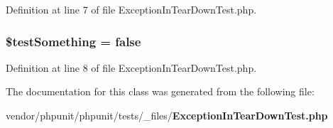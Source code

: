 Definition at line 7 of file Exception\+In\+Tear\+Down\+Test.\+php.

\subsubsection[{\$test\+Something}]{\setlength{\rightskip}{0pt plus 5cm}\${\bf test\+Something} = false}\label{class_exception_in_tear_down_test_a25acbdb5bf8dc30b31f537d60bfb02f5}


Definition at line 8 of file Exception\+In\+Tear\+Down\+Test.\+php.



The documentation for this class was generated from the following file\+:\begin{DoxyCompactItemize}
\item 
vendor/phpunit/phpunit/tests/\+\_\+files/{\bf Exception\+In\+Tear\+Down\+Test.\+php}\end{DoxyCompactItemize}
